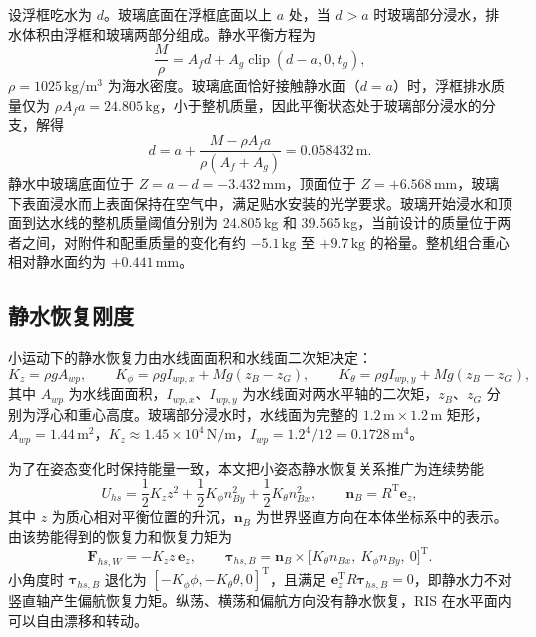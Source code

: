 设浮框吃水为 $d$。玻璃底面在浮框底面以上 $a$ 处，当 $d>a$ 时玻璃部分浸水，排水体积由浮框和玻璃两部分组成。静水平衡方程为
\begin{equation}
\frac{M}{\rho}=A_fd+A_g\operatorname{clip}(d-a,0,t_g),
\label{eq:c3_draft}
\end{equation}
$\rho=1025\,\mathrm{kg/m^3}$ 为海水密度。玻璃底面恰好接触静水面（$d=a$）时，浮框排水质量仅为 $\rho A_fa=24.805\,\mathrm{kg}$，小于整机质量，因此平衡状态处于玻璃部分浸水的分支，解得
\begin{equation}
d=a+\frac{M-\rho A_fa}{\rho(A_f+A_g)}=0.058432\,\mathrm{m}.
\label{eq:c3_draft_sol}
\end{equation}
静水中玻璃底面位于 $Z=a-d=-3.432\,\mathrm{mm}$，顶面位于 $Z=+6.568\,\mathrm{mm}$，玻璃下表面浸水而上表面保持在空气中，满足贴水安装的光学要求。玻璃开始浸水和顶面到达水线的整机质量阈值分别为 24.805\,kg 和 39.565\,kg，当前设计的质量位于两者之间，对附件和配重质量的变化有约 $-5.1\,\mathrm{kg}$ 至 $+9.7\,\mathrm{kg}$ 的裕量。整机组合重心相对静水面约为 $+0.441\,\mathrm{mm}$。

\subsection{静水恢复刚度}

小运动下的静水恢复力由水线面面积和水线面二次矩决定：
\begin{equation}
K_z=\rho gA_{wp},\qquad
K_\phi=\rho gI_{wp,x}+Mg(z_B-z_G),\qquad
K_\theta=\rho gI_{wp,y}+Mg(z_B-z_G),
\label{eq:c3_stiffness}
\end{equation}
其中 $A_{wp}$ 为水线面面积，$I_{wp,x}$、$I_{wp,y}$ 为水线面对两水平轴的二次矩，$z_B$、$z_G$ 分别为浮心和重心高度。玻璃部分浸水时，水线面为完整的 $1.2\,\mathrm{m}\times1.2\,\mathrm{m}$ 矩形，$A_{wp}=1.44\,\mathrm{m^2}$，$K_z\approx1.45\times10^4\,\mathrm{N/m}$，$I_{wp}=1.2^4/12=0.1728\,\mathrm{m^4}$。

为了在姿态变化时保持能量一致，本文把小姿态静水恢复关系推广为连续势能
\begin{equation}
U_{hs}=\frac12K_zz^2+\frac12K_\phi n_{By}^2+\frac12K_\theta n_{Bx}^2,\qquad \mathbf n_B=R^{\mathrm T}\mathbf e_z,
\label{eq:c3_potential}
\end{equation}
其中 $z$ 为质心相对平衡位置的升沉，$\mathbf n_B$ 为世界竖直方向在本体坐标系中的表示。由该势能得到的恢复力和恢复力矩为
\begin{equation}
\mathbf F_{hs,W}=-K_zz\,\mathbf e_z,\qquad
\boldsymbol\tau_{hs,B}=\mathbf n_B\times\big[K_\theta n_{Bx},\ K_\phi n_{By},\ 0\big]^{\mathrm T}.
\label{eq:c3_restoring}
\end{equation}
小角度时 $\boldsymbol\tau_{hs,B}$ 退化为 $[-K_\phi\phi,-K_\theta\theta,0]^{\mathrm T}$，且满足 $\mathbf e_z^{\mathrm T}R\boldsymbol\tau_{hs,B}=0$，即静水力不对竖直轴产生偏航恢复力矩。纵荡、横荡和偏航方向没有静水恢复，RIS 在水平面内可以自由漂移和转动。

